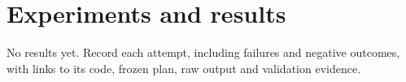 \section{Experiments and results}
\label{sec:results}
No results yet. Record each attempt, including failures and negative outcomes,
with links to its code, frozen plan, raw output and validation evidence.
